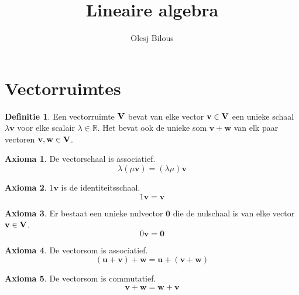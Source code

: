 \documentclass{amsart}
\theoremstyle{definition}
\newtheorem{axm}{Axioma}[section]
\newtheorem{dfn}{Definitie}[section]
\newcommand{\realnums}{\mathbb{R}}
\newcommand{\vecspace}[1][v]{\mathrm{\mathbf{\MakeUppercase#1}}}
\newcommand{\vvec}[1][v]{\mathbf{#1}}
\newcommand{\zerovec}{\vvec[0]}
\begin{document}
\title{Lineaire algebra}
\author{Olesj Bilous}
\maketitle

\section{Vectorruimtes}


\begin{dfn}
    Een vectorruimte $\vecspace$ bevat van elke vector $\vvec \in \vecspace$ een unieke schaal $\lambda \vvec$ voor elke scalair $\lambda \in \realnums$. Het bevat ook de unieke som $\vvec + \vvec[w]$ van elk paar vectoren $\vvec, \vvec[w] \in \vecspace$.
\end{dfn}

\begin{axm}
    De vectorschaal is associatief.
    \begin{equation*}
        \lambda (\mu \vvec) = (\lambda\mu)\vvec
    \end{equation*}
\end{axm}

\begin{axm}
    $1\vvec$ is de identiteitsschaal.
    \begin{equation*}
        1\vvec=\vvec
    \end{equation*}
\end{axm}

\begin{axm}
    Er bestaat een unieke nulvector $\zerovec$ die de nulschaal is van elke vector $\vvec \in \vecspace$.
    \begin{equation*}
        0\vvec=\zerovec
    \end{equation*}
\end{axm}

\begin{axm}
    De vectorsom is associatief.
    \begin{equation*}
        (\vvec[u] + \vvec) + \vvec[w] = \vvec[u] + (\vvec + \vvec[w])
    \end{equation*}
\end{axm}

\begin{axm}
    De vectorsom is commutatief.
    \begin{equation*}
        \vvec + \vvec[w] = \vvec[w] + \vvec
    \end{equation*}
\end{axm}
\end{document}
